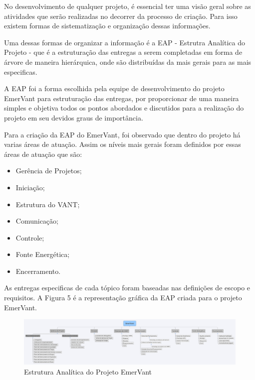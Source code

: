 
No desenvolvimento de qualquer projeto, é essencial ter uma visão geral sobre as atividades que serão realizadas no decorrer da processo de criação.  Para isso existem formas de sistematização e organização dessas informações.

Uma dessas formas de organizar a informação é a EAP - Estrutra Analítica do Projeto - que é a estruturação das entregas a serem completadas em forma de árvore de maneira hierárquica, onde são distribuídas da mais gerais para as mais especificas.

A EAP foi a forma escolhida pela equipe de desenvolvimento do projeto EmerVant para estruturação das entregas, por proporcionar de uma maneira simples e objetiva todos os pontos abordados e discutidos para a realização do projeto em seu devidos graus de importância. 

Para a criação da EAP do EmerVant, foi observado que dentro do projeto há varias áreas de atuação. Assim os níveis mais gerais foram definidos por essas áreas de atuação que são:
\begin{itemize}
\item Gerência de Projetos;
\item Iniciação;
\item Estrutura do VANT;
\item Comunicação;
\item Controle;
\item Fonte Energética;
\item Encerramento.
\end{itemize}
As entregas especificas de cada tópico foram baseadas nas definições de escopo e requisitos. A Figura 5 é a representação gráfica da EAP criada para o projeto EmerVant.
\vfill

\begin{figure}[ht]
  \centering
    \includegraphics[keepaspectratio=true,scale=0.3,angle=90]{figuras/eap.png}
  \caption{Estrutura Analítica do Projeto EmerVant}
\end{figure}

\pagebreak
